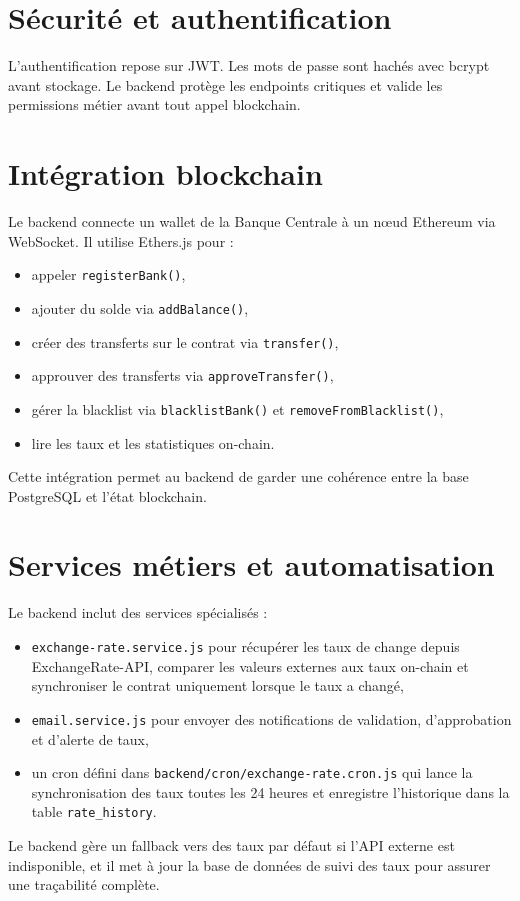 \documentclass[a4paper,12pt]{report}
\begin{document}
\section{Sécurité et authentification}
L'authentification repose sur JWT. Les mots de passe sont hachés avec bcrypt avant stockage. Le backend protège les endpoints critiques et valide les permissions métier avant tout appel blockchain.

\section{Intégration blockchain}
Le backend connecte un wallet de la Banque Centrale à un nœud Ethereum via WebSocket. Il utilise Ethers.js pour :
\begin{itemize}[leftmargin=*,nosep]
  \item appeler \texttt{registerBank()},
  \item ajouter du solde via \texttt{addBalance()},
  \item créer des transferts sur le contrat via \texttt{transfer()},
  \item approuver des transferts via \texttt{approveTransfer()},
  \item gérer la blacklist via \texttt{blacklistBank()} et \texttt{removeFromBlacklist()},
  \item lire les taux et les statistiques on-chain.
\end{itemize}
Cette intégration permet au backend de garder une cohérence entre la base PostgreSQL et l'état blockchain.

\section{Services métiers et automatisation}
Le backend inclut des services spécialisés :
\begin{itemize}[leftmargin=*,nosep]
  \item \texttt{exchange-rate.service.js} pour récupérer les taux de change depuis ExchangeRate-API, comparer les valeurs externes aux taux on-chain et synchroniser le contrat uniquement lorsque le taux a changé,
  \item \texttt{email.service.js} pour envoyer des notifications de validation, d'approbation et d'alerte de taux,
  \item un cron défini dans \texttt{backend/cron/exchange-rate.cron.js} qui lance la synchronisation des taux toutes les 24 heures et enregistre l'historique dans la table \texttt{rate\_history}.
\end{itemize}
Le backend gère un fallback vers des taux par défaut si l'API externe est indisponible, et il met à jour la base de données de suivi des taux pour assurer une traçabilité complète.
\end{document}
